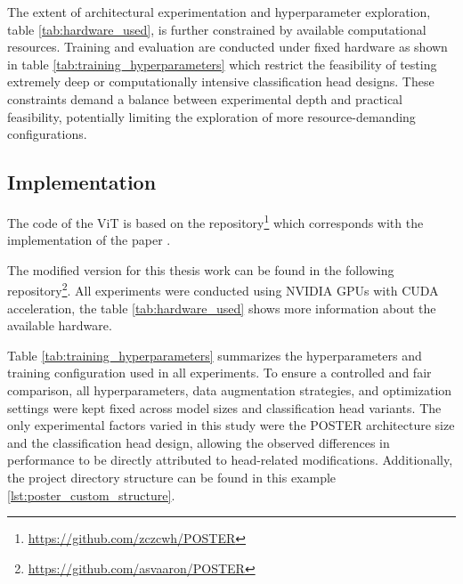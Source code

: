 The extent of architectural experimentation and hyperparameter exploration, table \ref{tab:hardware_used}, is further constrained by available computational resources. Training and evaluation are conducted under fixed hardware as shown in table \ref{tab:training_hyperparameters}  which restrict the feasibility of testing extremely deep or computationally intensive classification head designs. These constraints demand a balance between experimental depth and practical feasibility, potentially limiting the exploration of more resource-demanding configurations.


%


\subsection{Implementation}



The code of the ViT is based on the  repository\footnote{\url{https://github.com/zczcwh/POSTER}} which corresponds with the implementation of the paper \cite{zheng_poster_2022}. 

The modified version for this thesis work can be found in the following repository\footnote{\url{https://github.com/asvaaron/POSTER}}. All experiments were conducted using NVIDIA GPUs with CUDA acceleration, the table \ref{tab:hardware_used} shows more information about the available hardware. 

Table \ref{tab:training_hyperparameters} summarizes the hyperparameters and training configuration used in all experiments. To ensure a controlled and fair comparison, all hyperparameters, data augmentation strategies, and optimization settings were kept fixed across model sizes and classification head variants. The only experimental factors varied in this study were the \gls{POSTER} architecture size and the classification head design, allowing the observed differences in performance to be directly attributed to head-related modifications. Additionally, the project directory structure can be found in this example \ref{lst:poster_custom_structure}.


